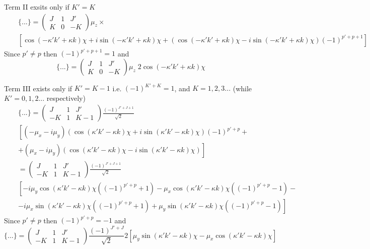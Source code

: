 Term II exsits only if $K' = K$
\begin{eqnarray} \nonumber
&& \{...\} = 
\left( \begin{array}{ccc} 
 J &  1 &  J' \\
 K &  0 & -K  \end{array} \right)
\mu_z \times \\
&&
\left[ \cos ( -\kappa' k' + \kappa k) \chi + i \sin ( -\kappa' k' + \kappa k) \chi + 
\left( \cos ( -\kappa' k' + \kappa k) \chi - i \sin ( -\kappa' k' + \kappa k) \chi \right) (-1)^{p'+p+1} \right]
\end{eqnarray}
Since $p' \ne p$ then $(-1)^{p'+p+1}=1$ and
\begin{equation}
\{...\} =     
\left( \begin{array}{ccc} 
 J &  1 &  J' \\
 K &  0 & -K   \end{array} \right)
\mu_z \; 2 \cos (-\kappa' k' + \kappa k) \chi
\end{equation}


Term III exists only if $K' = K -1$ i.e. $(-1)^{K'+K} = 1$, and $K = 1, 2, 3...$ (while $K' = 0, 1, 2...$ respectively)
\begin{eqnarray}  \nonumber
&& \{...\} = 
\left( \begin{array}{ccc} 
 J &  1 &  J' \\
-K &  1 & K-1  \end{array} \right)
\frac{(-1)^{J'+J+1}}{\sqrt{2}} \\ \nonumber
&&
\left[ ( -\mu_x - i \mu_y) 
\left( \cos ( \kappa' k' - \kappa k) \chi + i \sin ( \kappa' k' - \kappa k) \chi \right) (-1)^{p'+p} + \right. \\
&& \left.
+ ( \mu_x - i \mu_y)
\left( \cos ( \kappa' k' - \kappa k) \chi - i \sin ( \kappa' k' - \kappa k) \chi \right) \right] \\ \nonumber
&& = 
\left( \begin{array}{ccc} 
 J &  1 &  J' \\
-K &  1 & K-1  \end{array} \right)
\frac{(-1)^{J'+J+1}}{\sqrt{2}} \\ \nonumber
&& \left[ 
-i \mu_y \cos ( \kappa' k' - \kappa k) \chi \left( (-1)^{p'+p} + 1 \right)
-  \mu_x \cos ( \kappa' k' - \kappa k) \chi \left( (-1)^{p'+p} - 1 \right) - \right. \\
&& \left.
-i \mu_x \sin ( \kappa' k' - \kappa k) \chi \left( (-1)^{p'+p} + 1 \right)
+  \mu_y \sin ( \kappa' k' - \kappa k) \chi \left( (-1)^{p'+p} - 1 \right) \right]
\end{eqnarray}
Since $p' \ne p$ then $(-1)^{p'+p} = -1$ and
\begin{equation}
\{...\} = 
\left( \begin{array}{ccc} 
 J &  1 &  J' \\
-K &  1 & K-1  \end{array} \right)
\frac{(-1)^{J'+J}}{\sqrt{2}} 2  \left[
\mu_y \sin ( \kappa' k' - \kappa k) \chi -  \mu_x \cos ( \kappa' k' - \kappa k) \chi \right]
\end{equation}

